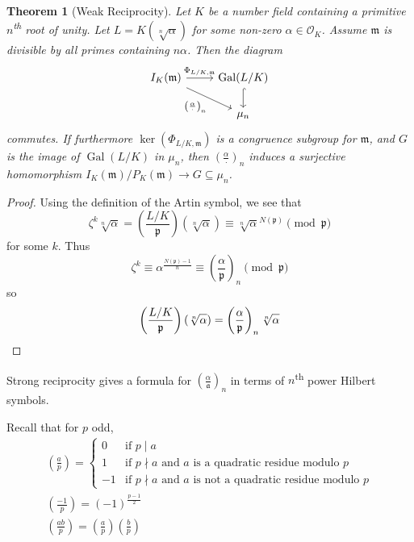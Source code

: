 \documentclass[11pt]{article}
\theoremstyle{definition}
\theoremstyle{plain}
\newtheorem{theorem}[definition]{Theorem}
\theoremstyle{remark}
\DeclareMathOperator{\Gal}{Gal}
\newcommand{\cO}{\mathcal{O}}
\newcommand{\fa}{\mathfrak{a}}
\newcommand{\fp}{\mathfrak{p}}
\newcommand{\fm}{\mathfrak{m}}
\newcommand{\leg}[2]{\left(\frac{#1}{#2}\right)}
\begin{document}
\begin{theorem}[Weak Reciprocity]\label{thm:4_11}
    Let $K$ be a number field containing a primitive $n$\textsuperscript{th} root of unity. Let $L = K(\sqrt[n]{\alpha})$ for some non-zero $\alpha \in \cO_K$. Assume $\fm$ is divisible by all primes containing $n\alpha$. Then the diagram
    \begin{equation*}
    \begin{tikzcd}
        I_K(\fm) \arrow[r, "\Phi_{L/K, \fm}"] \arrow[rd, "\leg{\alpha}{\cdot}_n"'] & \Gal(L/K) \arrow[d, hookrightarrow]\\
                           & \mu_n
    \end{tikzcd}
    \end{equation*}
    commutes. If furthermore $\ker(\Phi_{L/K, \fm})$ is a congruence subgroup for $\fm$, and $G$ is the image of $\Gal(L/K)$ in $\mu_n$, then $\leg{\alpha}{\cdot}_n$ induces a surjective homomorphism $I_K(\fm)/P_K(\fm) \to G \subseteq \mu_n$.
\end{theorem}
\begin{proof}
    Using the definition of the Artin symbol, we see that
    \begin{equation*}
        \zeta^k \sqrt[n]{\alpha} = \leg{L/K}{\fp}(\sqrt[n]{\alpha}) \equiv \sqrt[n]{\alpha}^{N(\fp)} \pmod{\fp}
    \end{equation*}
    for some $k$. Thus
    \begin{equation*}
        \zeta^k \equiv \alpha^\frac{N(\fp)-1}{n} \equiv \leg{\alpha}{\fp}_n \pmod{\fp}
    \end{equation*}
    so
    \begin{equation*}
        \leg{L/K}{\fp}(\sqrt[n]{\alpha}) = \leg{\alpha}{\fp}_n \sqrt[n]{\alpha} \qedhere
    \end{equation*}
\end{proof}

\noindent Strong reciprocity gives a formula for $\leg{\alpha}{\fa}_n$ in terms of $n$\textsuperscript{th} power Hilbert symbols.

\noindent Recall that for $p$ odd,
\begin{gather*}
    \leg{a}{p} =
    \begin{cases}
        0 & \text{if } p \mid a\\
        1 & \text{if } p \nmid a \text{ and } a \text{ is a quadratic residue modulo } p\\
        -1 & \text{if } p \nmid a \text{ and } a \text{ is not a quadratic residue modulo } p
    \end{cases}\\
    \leg{-1}{p} = (-1)^{\frac{p-1}{2}}\\
    \leg{ab}{p} = \leg{a}{p} \leg{b}{p}
\end{gather*}
\end{document}
